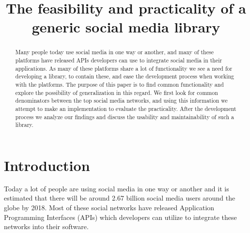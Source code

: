 \documentclass{sigchi-alternate}
\begin{document}

\title{The feasibility and practicality of a generic social media library}

\author{
}


\maketitle

\begin{abstract}
Many people today use social media in one way or another, and many of these platforms have released APIs developers can use to integrate social media
in their applications. As many of these platforms share a lot of functionality we see a need for developing a library, to contain these, and ease the
development process when working with the platforms. The purpose of this paper is to find common functionality and explore the possibility of generalization
in this regard. We first look for common denominators between the top social media networks, and using this information we attempt to make an implementation
to evaluate the practicality. After the development process we analyze our findings and discuss the usability and maintainability of such a library.
\end{abstract}

\section{Introduction}
Today a lot of people are using social media in one way or another and it is estimated that there will be around 2.67 billion social media
users around the globe by 2018\autocite{STATISTA_SN_WORLD_USERS}. Most of these social networks have released Application Programming Interfaces (APIs)
which developers can utilize to integrate these networks into their software.
\end{document}
